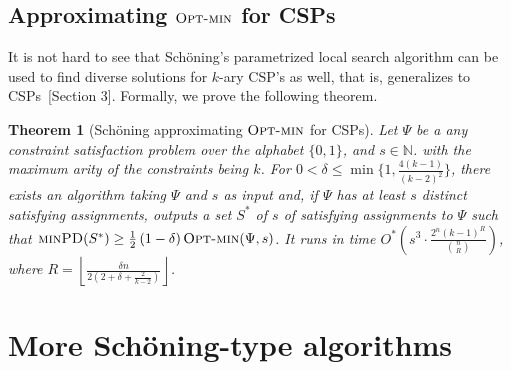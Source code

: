 \documentclass[11pt, letterpaper]{article}
\newtheorem{theorem}{Theorem}
\theoremstyle{definition}
\newcommand{\PD}{\textsc{minPD}}
\newcommand{\optm}{\textsc{Opt-min}}
\newcommand{\sch}{Sch\"{o}ning\xspace}
\newcommand{\IN}{\ensuremath{\mathbb{N}}}
\newcommand{\floor}[1]{{\left\lfloor{#1}\right\rfloor}}
\begin{document}
\subsection{Approximating $\optm$ for CSPs}
\label{sec:csp}
It is not hard to see that \sch's parametrized local search algorithm can be used to find diverse solutions for $k$-ary CSP's as well, that is,  generalizes to CSPs~\cite{schoning1999probabilistic}[Section 3]. Formally, we prove the following theorem. 
\begin{theorem}[\sch approximating $\optm$ for CSPs] \label{thm:sch-for-mindisp-CSP}
    Let $\Psi$ be a any constraint satisfaction problem over the alphabet $\{0,1\}$, and $s \in \IN$. with the maximum arity of the constraints being $k$. For $0 < \delta \leq \min\{1, \frac{4(k-1)}{(k-2)^2} \}$, there exists an algorithm taking $\Psi$ and $s$ as input and, if $\Psi$ has at least $s$ distinct satisfying assignments, outputs a set $S^*$ of $s$ of satisfying assignments to $\Psi$ such that $\PD(S^*) \geq \frac{1}{2}\left(1-\delta \right) \optm(\Psi,s)$. It runs in time $O^*\left(s^3 \cdot  \frac{2^n (k-1)^{R}}{\binom{n}{R} }\right)$, where $R=\floor{\frac{\delta n}{2(2+\delta+ \frac{2}{k-2})}}$.  
    
\end{theorem} 

\newpage
\appendix
\section{More \sch-type algorithms}
\end{document}
